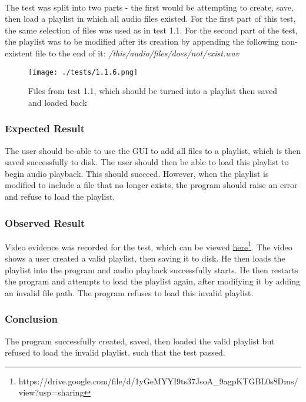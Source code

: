 \paragraph{}
The test was split into two parts - the first would be attempting to create, save, then load a playlist in which all audio files existed. For the first part of this test, the same selection of files was used as in test 1.1. For the second part of the test, the playlist was to be modified after its creation by appending the following non-existent file to the end of it:
\textit{/this/audio/files/does/not/exist.wav}
\begin{figure}[H]
	\texttt{[image: ./tests/1.1.6.png]}
	\caption{Files from test 1.1, which should be turned into a playlist then saved and loaded back}
\end{figure}

\subsubsection{Expected Result}
The user should be able to use the GUI to add all files to a playlist, which is then saved successfully to disk. The user should then be able to load this playlist to begin audio playback. This should succeed. However, when the playlist is modified to include a file that no longer exists, the program should raise an error and refuse to load the playlist.

\subsubsection{Observed Result}
\label{sec:evidence1.2}
Video evidence was recorded for the test, which can be viewed \href{https://drive.google.com/file/d/1yGeMYYI9ts37JsoA_9agpKTGBL0s8Dms/view?usp=sharing}{here}\footnote{
	https://drive.google.com/file/d/1yGeMYYI9ts37JsoA\_9agpKTGBL0s8Dms/view?usp=sharing
}.  The video shows a user created a valid playlist, then saving it to disk. He then loads the playlist into the program and audio playback successfully starts. He then restarts the program and attempts to load the playlist again, after modifying it by adding an invalid file path. The program refuses to load this invalid playlist.

\subsubsection{Conclusion}
The program successfully created, saved, then loaded the valid playlist but refused to load the invalid playlist, such that the test passed.

